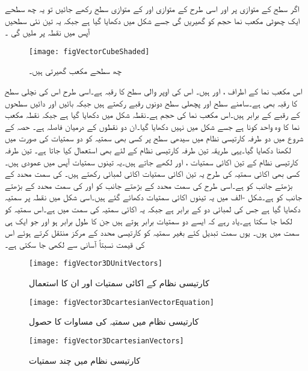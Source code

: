 اگر سطح   کے متوازی  پر اور اسی طرح  کے متوازی  اور  کے متوازی  سطح رکھے جائیں تو یہ چھ سطحے ایک چھوٹی  مکعب نما حجم  کو گھیریں گی جسے شکل  میں دکھایا گیا ہے جبکہ یہ تین نئی سطحیں آپس میں نقطہ  پر ملیں گی ۔
\begin{figure}
\centering
\texttt{[image: figVectorCubeShaded]}
\caption{چھ سطحے مکعب گھیرتی ہیں۔}
\label{شکل_سمتیہ_کارتیسی_چھوٹی_مکعب}
\end{figure}
اس مکعب نما کے اطراف ،  اور  ہیں۔ اس کی اوپر والی سطح کا رقبہ  ہے۔اسی طرح اس کی نچلی سطح کا رقبہ بھی  ہے۔سامنے سطح  اور پچھلی سطح دونوں  رقبے رکھتے ہیں جبکہ بائیں  اور دائیں سطحوں کے رقبے  کے برابر ہیں۔اس مکعب نما کی حجم  ہے۔نقطہ  شکل میں دکھایا گیا ہے جبکہ
 نقطہ  مکعب نما کا وہ واحد کونا ہے جسے شکل میں نہیں دکھایا گیا۔ان دو نقطوں کے درمیان فاصلہ  ہے۔
حصہ   کے شروع میں دو طرفہ کارتیسی نظام  میں سیدھی سطح پر کسی بھی سمتیہ کو دو سمتیات کی صورت میں لکھنا دکھایا گیا۔یہی طریقہ تین طرفہ کارتیسی نظام کے لئے بھی استعمال کیا جاتا ہے۔ تین طرفہ کارتیسی نظام کے تین اکائی سمتیات ،  اور  لکھے جاتے ہیں۔یہ تینوں سمتیات آپس میں عمودی ہیں۔کسی بھی اکائی سمتیہ کی طرح یہ تین اکائی سمتیات اکائی لمبائی رکھتے ہیں۔  کی سمت  محدد کے بڑھتے جانب کو ہے۔اسی طرح  کی سمت  محدد کے بڑھتے جانب کو اور  کی سمت  محدد کے بڑھتے جانب کو ہے۔شکل -الف میں یہ تینوں اکائی سمتیات دکھائے گئے ہیں۔اسی شکل میں نقطہ  پر سمتیہ دکھایا گیا ہے جس کی لمبائی دو کے برابر ہے جبکہ یہ اکائی سمتیہ  کی سمت میں ہے۔اس سمتیہ کو  لکھا جا سکتا ہے۔یاد رہے کہ ایسے دو سمتیات برابر ہوتے ہیں جن کا طول برابر ہو اور جو ایک ہی سمت میں ہوں۔ یوں سمت تبدیل کئے بغیر سمتیہ کو کارتیسی محدد کے مرکز منتقل کرتے ہوئے اس کی قیمت نسبتاً آسانی سے لکھی جا سکتی ہے۔
\begin{figure}
\centering
\texttt{[image: figVector3DUnitVectors]}
\caption{کارتیسی نظام کے اکائی سمتیات اور ان کا استعمال}
\label{شکل_سمتیہ_کارتیسی_تین_اکائی_سمتیات}
\end{figure}
%
\begin{figure}
\centering
\texttt{[image: figVector3DcartesianVectorEquation]}
\caption{کارتیسی نظام میں سمتیہ کی مساوات کا حصول}
\label{شکل_سمتیہ_کارتیسی_سمتیہ_کی_مساوات}
\end{figure}
%
\begin{figure}
\centering
\texttt{[image: figVector3DcartesianVectors]}
\caption{کارتیسی نظام میں چند سمتیات}
\label{شکل_سمتیہ_کارتیسی_چند_سمتیات}
\end{figure}
%

